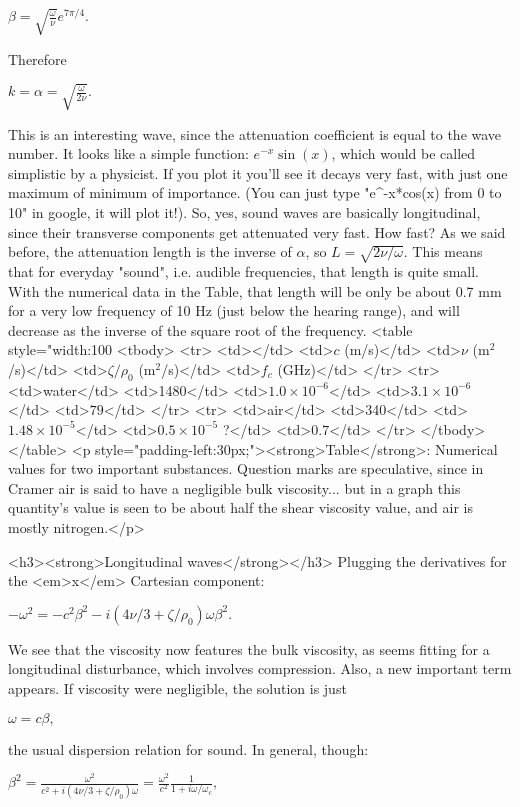 $ \beta =\sqrt{ \frac{\omega}{ \nu}}e^{ 7 \pi/4}.$

Therefore

$ k=\alpha =\sqrt{ \frac{\omega}{ 2 \nu}}.$

This is an interesting wave, since the attenuation coefficient is equal to the wave number. It looks like a simple function: $ e^{-x}\sin(x)$, which would be called simplistic by a physicist. If you plot it you'll see it decays very fast, with just one maximum of minimum of importance. (You can just type "e^-x*cos(x) from 0 to 10" in google, it will plot it!). So, yes, sound waves are basically longitudinal, since their transverse components get attenuated very fast. How fast? As we said before, the attenuation length is the inverse of $ \alpha$, so $ L=\sqrt{2\nu/\omega}$. This means that for everyday "sound", i.e. audible frequencies, that length is quite small. With the numerical data in the Table, that length will be only be about 0.7 mm for a very low frequency of 10 Hz (just below the hearing range), and will decrease as the inverse of the square root of the frequency.
<table style="width:100%
<tbody>
<tr>
<td></td>
<td>$ c$ (m/s)</td>
<td>$ \nu$ (m$ {}^2$/s)</td>
<td>$ \zeta/\rho_0$ (m$ {}^2$/s)</td>
<td>$ f_c$ (GHz)</td>
</tr>
<tr>
<td>water</td>
<td>1480</td>
<td>$ 1.0 \times 10^{-6}$</td>
<td>$ 3.1 \times 10^{-6}$</td>
<td>$ 79$</td>
</tr>
<tr>
<td>air</td>
<td>340</td>
<td>$ 1.48 \times 10^{-5}$</td>
<td>$ 0.5 \times 10^{-5}$ ?</td>
<td>$ 0.7$</td>
</tr>
</tbody>
</table>
<p style="padding-left:30px;"><strong>Table</strong>: Numerical values for two important substances. Question marks are speculative, since in Cramer air is said to have a negligible bulk viscosity... but in a graph this quantity's value is seen to be about half the shear viscosity value, and air is mostly nitrogen.</p>

<h3><strong>Longitudinal waves</strong></h3>
Plugging the derivatives for the <em>x</em> Cartesian component:

$ -\omega^2 = - c^2\beta^2 - i (4\nu/3+\zeta/\rho_0)  \omega \beta^2.$

We see that the viscosity now features the bulk viscosity, as seems fitting for a longitudinal disturbance, which involves compression. Also, a new important term appears. If viscosity were negligible, the solution is just

$  \omega =  c \beta , $

the usual dispersion relation for sound. In general, though:

$ \beta^2 = \frac{\omega^2}{c^2+i(4\nu/3+\zeta/\rho_0)\omega}=\frac{\omega^2}{c^2}\frac{1}{1+ i\omega/\omega_c},$


